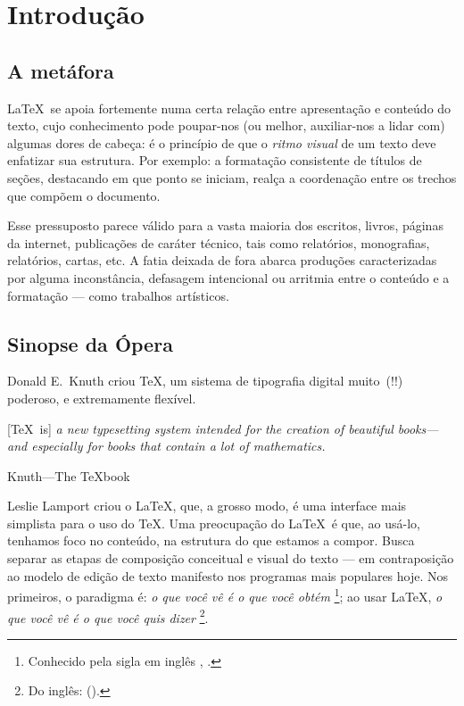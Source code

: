 \section{Introdução}



\subsection{A metáfora}

\LaTeX\ se apoia fortemente numa certa relação entre apresentação e
conteúdo do texto, cujo
conhecimento pode poupar-nos (ou melhor, auxiliar-nos a lidar com)
algumas dores de cabeça: é o princípio de que o \emph{ritmo visual} de
um texto deve enfatizar sua estrutura. Por exemplo: a formatação
consistente de títulos de seções, destacando em que ponto se iniciam,
realça a coordenação entre os trechos que compõem o documento.

Esse pressuposto parece válido para a vasta maioria dos escritos,
livros, páginas da internet, publicações de caráter técnico, 
tais como relatórios, monografias,  relatórios, cartas, etc. A fatia
deixada de fora abarca produções caracterizadas por alguma
inconstância, defasagem intencional ou arritmia entre o conteúdo e a
formatação --- como trabalhos artísticos.

\subsection{Sinopse da Ópera}

Donald E.~Knuth criou \TeX, um sistema de tipografia digital muito~(!!)
poderoso, e extremamente flexível.

\begin{center}
\begin{minipage}{.75\textwidth}
  [\TeX\ is] \textit{a new typesetting system intended for the creation of
  beautiful books---and especially for books that contain a lot of
  mathematics.}

  \hfill Knuth---The \TeX book~\cite{texbook}
\end{minipage}
\end{center}

  
Leslie Lamport criou o \LaTeX, que, a grosso modo, é uma interface
mais simplista para o uso do \TeX. Uma preocupação do \LaTeX\ é que,
ao usá-lo, tenhamos foco no conteúdo, na estrutura do que estamos a
compor. Busca separar as etapas de composição conceitual e visual do
texto --- em contraposição ao modelo de edição de texto manifesto nos
programas mais populares hoje. Nos primeiros, o paradigma é: 
\emph{o que você vê é o que você obtém}%
\footnote{Conhecido pela sigla em inglês \acronimo{\acronimowysiwyg},
  \emph{\wysiwyg}.}; ao usar
\LaTeX, \emph{o que você vê é o que você quis dizer}%
\footnote{Do inglês: \emph{\wysiwym} (\acronimo{\acronimowysiwym}).}\negthinspace.



